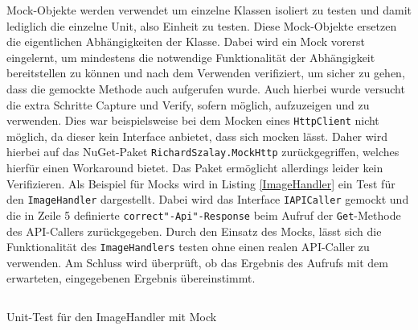 \noindent Mock-Objekte werden verwendet um einzelne Klassen isoliert zu testen und damit lediglich die einzelne Unit, also Einheit zu testen. Diese Mock-Objekte ersetzen die eigentlichen Abhängigkeiten der Klasse. Dabei wird ein Mock vorerst eingelernt, um mindestens die notwendige Funktionalität der Abhängigkeit bereitstellen zu können und nach dem Verwenden verifiziert, um sicher zu gehen, dass die gemockte Methode auch aufgerufen wurde. Auch hierbei wurde versucht die extra Schritte Capture und Verify, sofern möglich, aufzuzeigen und zu verwenden. Dies war beispielsweise bei dem Mocken eines \texttt{HttpClient} nicht möglich, da dieser kein Interface anbietet, dass sich mocken lässt. Daher wird hierbei auf das NuGet-Paket \texttt{RichardSzalay.MockHttp} zurückgegriffen, welches hierfür einen Workaround bietet. Das Paket ermöglicht allerdings leider kein Verifizieren. Als Beispiel für Mocks wird in Listing \ref{ImageHandler} ein Test für den \texttt{ImageHandler} dargestellt. Dabei wird das Interface \texttt{IAPICaller} gemockt und die in Zeile 5 definierte \texttt{correct"-Api"-Response} beim Aufruf der \texttt{Get}-Methode des API-Callers zurückgegeben. Durch den Einsatz des Mocks, lässt sich die Funktionalität des \texttt{ImageHandlers} testen ohne einen realen API-Caller zu verwenden. Am Schluss wird überprüft, ob das Ergebnis des Aufrufs mit dem erwarteten, eingegebenen Ergebnis übereinstimmt.

\begin{listing}[h]
\inputminted[linenos, frame=lines, breaklines, tabsize=2, breakbytokenanywhere]{csharp}{Listings/ImageHandlerTest.cs}
\caption{Unit-Test für den ImageHandler mit Mock}
\label{ImageHandler}
\end{listing}

